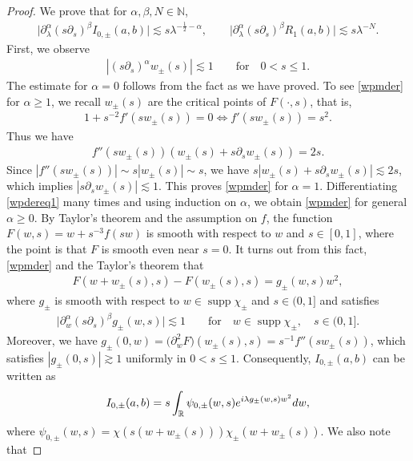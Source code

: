 \documentclass[10pt,a4paper]{article}
\numberwithin{equation}{section}
\def\R{\mathbb{R}}%
\DeclareMathOperator{\supp}{supp}%
\def\a{\alpha}
\def\b{\beta}
\def\g{\psi}
\def\l{\lambda}
\def\pa{\partial}
\begin{document}
\begin{proof}
We prove that for $\a,\b,N\in\mathbb{N}$,
\begin{align}\label{I0abest}
\big|\pa_{\l}^{\a}(s\pa_{s})^{\b}I_{0,\pm}(a,b)\big|\lesssim s\l^{-\frac{1}{2}-\a},\qquad \big|\pa_{\l}^{\a}(s\pa_{s})^{\b}R_1(a,b)\big|\lesssim s\l^{-N}.
\end{align}
First, we observe
\begin{align}\label{wpmder}
|(s\pa_s)^{\a}w_{\pm}(s)|\lesssim 1\qquad \text{for}\quad 0<s\leq 1.
\end{align}
The estimate for $\a=0$ follows from the fact  as we have proved.
To see \eqref{wpmder} for $\a\geq 1$, we recall $w_{\pm}(s)$ are the critical points of $F(\cdot,s)$, that is,
\begin{align*}
1+s^{-2}f'(sw_{\pm}(s))=0\Leftrightarrow f'(sw_{\pm}(s))=s^2.
\end{align*}
Thus we have
\begin{align}\label{wpdereq1}
f''(sw_{\pm}(s))(w_{\pm}(s)+s\pa_sw_{\pm}(s))=2s.
\end{align}
Since $|f''(sw_{\pm}(s))|\sim s|w_{\pm}(s)|\sim s$, we have $s|w_{\pm}(s)+s\pa_sw_{\pm}(s)|\lesssim 2s$, which implies $|s\pa_sw_{\pm}(s)|\allowbreak\lesssim 1$. This proves \eqref{wpmder} for $\a=1$. Differentiating \eqref{wpdereq1} many times and using induction on $\a$, we obtain \eqref{wpmder} for general $\a\geq 0$. By Taylor's theorem and the assumption on $f$, the function~${F(w,s)=w+s^{-3}f(sw)}$ is smooth with respect to $w$ and $s\in [0,1]$, where the point is that $F$ is smooth even near $s=0$. It turns out from this fact, \eqref{wpmder} and the Taylor's theorem that
\begin{align*}
F(w+w_{\pm}(s),s)-F(w_{\pm}(s),s)=g_{\pm}(w,s)w^2,
\end{align*}
where $g_{\pm}$ is smooth with respect to $w\in \supp \chi_{\pm}$ and $s\in (0,1]$ and satisfies
\begin{align*}
\big|\pa_w^{\a}(s\pa_s)^{\b}g_{\pm}(w,s)\big|\lesssim 1\qquad \text{for}\quad w\in \supp \chi_{\pm},\quad s\in (0,1].
\end{align*}
Moreover, we have $g_{\pm}(0,w)=\bigl(\pa_w^2F\bigr)(w_{\pm}(s),s)=s^{-1}f''(sw_{\pm}(s))$, which satisfies $|g_{\pm}(0,s)|\gtrsim 1$ uniformly in $0<s\leq 1$. Consequently, $I_{0,\pm}(a,b)$ can be written as
\begin{align*}
I_{0,\pm}(a,b)=s\int_{\R}\g_{0,\pm}(w,s){\rm e}^{{\rm i}\l g_{\pm}(w,s)w^2}{\rm d}w,
\end{align*}
where $\g_{0,\pm}(w,s)=\chi(s(w+w_{\pm}(s)))\chi_{\pm}(w+w_{\pm}(s))$. We also note that

\end{proof}
\end{document}
